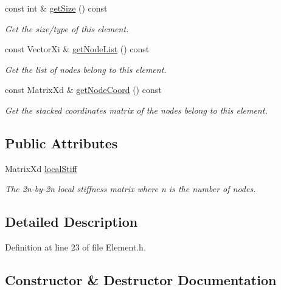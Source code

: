 \begin{DoxyCompactItemize}
$$const int \& \mbox{\hyperlink{class_element_a0221b246d9ca632136cc39790c46ee8f}{get\+Size}} () const
\begin{DoxyCompactList}\small\item\em Get the size/type of this element. \end{DoxyCompactList}\item 
const Vector\+Xi \& \mbox{\hyperlink{class_element_a763e0e4a46e68823903557a605dc5474}{get\+Node\+List}} () const
\begin{DoxyCompactList}\small\item\em Get the list of nodes belong to this element. \end{DoxyCompactList}\item 
const Matrix\+Xd \& \mbox{\hyperlink{class_element_a4d12b24e62592a1456e04d15872d5240}{get\+Node\+Coord}} () const
\begin{DoxyCompactList}\small\item\em Get the stacked coordinates matrix of the nodes belong to this element. \end{DoxyCompactList}\end{DoxyCompactItemize}
\subsection*{Public Attributes}
\begin{DoxyCompactItemize}
\item 
\mbox{\label{class_element_adb81184f683d1eebb5b3a28887ff8df4}} 
Matrix\+Xd \mbox{\hyperlink{class_element_adb81184f683d1eebb5b3a28887ff8df4}{local\+Stiff}}
\begin{DoxyCompactList}\small\item\em The 2n-\/by-\/2n local stiffness matrix where n is the number of nodes. \end{DoxyCompactList}\end{DoxyCompactItemize}


\subsection{Detailed Description}


Definition at line 23 of file Element.\+h.



\subsection{Constructor \& Destructor Documentation}
\mbox{\label{class_element_a05c744ed2de597b38da74c7765f5ed1b}} 
